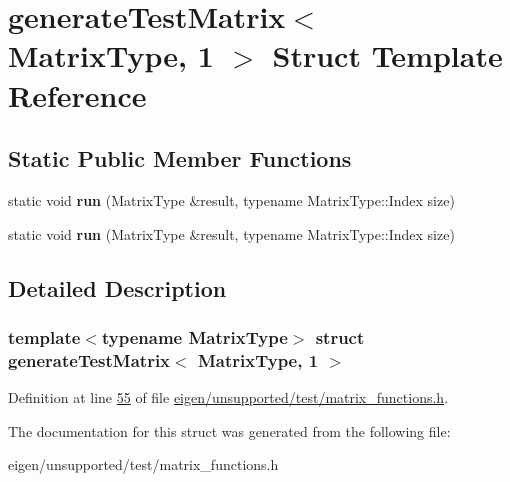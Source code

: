 \hypertarget{structgenerate_test_matrix_3_01_matrix_type_00_011_01_4}{}\section{generate\+Test\+Matrix$<$ Matrix\+Type, 1 $>$ Struct Template Reference}
\label{structgenerate_test_matrix_3_01_matrix_type_00_011_01_4}
\subsection*{Static Public Member Functions}
\begin{DoxyCompactItemize}
\item 
\mbox{\label{structgenerate_test_matrix_3_01_matrix_type_00_011_01_4_a14a4bc08d97e0b5ffd342534f3500134}} 
static void {\bfseries run} (Matrix\+Type \&result, typename Matrix\+Type\+::\+Index size)
\item 
\mbox{\label{structgenerate_test_matrix_3_01_matrix_type_00_011_01_4_a14a4bc08d97e0b5ffd342534f3500134}} 
static void {\bfseries run} (Matrix\+Type \&result, typename Matrix\+Type\+::\+Index size)
\end{DoxyCompactItemize}


\subsection{Detailed Description}
\subsubsection*{template$<$typename Matrix\+Type$>$\newline
struct generate\+Test\+Matrix$<$ Matrix\+Type, 1 $>$}



Definition at line \hyperlink{eigen_2unsupported_2test_2matrix__functions_8h_source_l00055}{55} of file \hyperlink{eigen_2unsupported_2test_2matrix__functions_8h_source}{eigen/unsupported/test/matrix\+\_\+functions.\+h}.



The documentation for this struct was generated from the following file\+:\begin{DoxyCompactItemize}
\item 
eigen/unsupported/test/matrix\+\_\+functions.\+h\end{DoxyCompactItemize}
